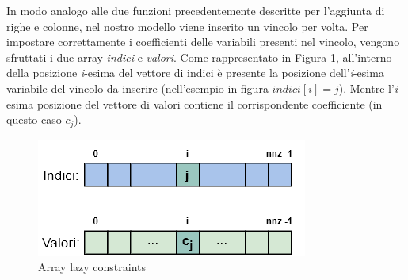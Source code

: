 In modo analogo alle due funzioni precedentemente descritte per l'aggiunta di righe e colonne, nel nostro modello viene inserito un vincolo per volta. Per impostare correttamente i coefficienti delle variabili presenti nel vincolo, vengono sfruttati i due array \textit{indici} e \textit{valori}. Come rappresentato in Figura \ref{lazy_constraints}, all'interno della posizione \textit{i}-esima del vettore di indici è presente la posizione dell'\textit{i}-esima variabile del vincolo da inserire (nell'esempio in figura $indici[i]=j$). Mentre l'\textit{i}-esima posizione del vettore di valori contiene il corrispondente  coefficiente (in questo caso $c_j$).
\begin{figure}[h] 
\begin{center} 
  \includegraphics[scale=0.5]{Images/lazy_constraints} 
  \caption{\footnotesize{Array lazy constraints}}
  \label{lazy_constraints} 
\end{center} 
\end{figure}
\vspace{10cm}
